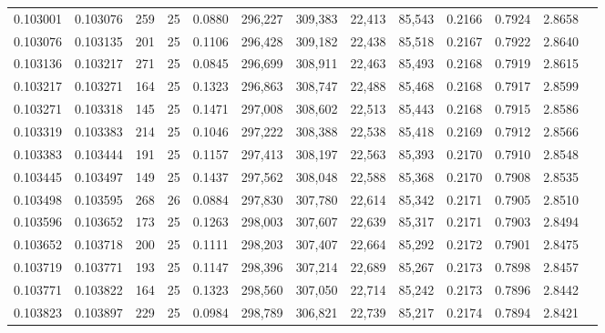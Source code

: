 \begin{tabular}{rrrrrrrrrrrrr}
0.103001 & 0.103076 &   259 &  25 &                                     0.0880 & 296,227 & 309,383 &  22,413 &  85,543 & 0.2166 & 0.7924 & 2.8658 \\
0.103076 & 0.103135 &   201 &  25 &                                     0.1106 & 296,428 & 309,182 &  22,438 &  85,518 & 0.2167 & 0.7922 & 2.8640 \\
0.103136 & 0.103217 &   271 &  25 &                                     0.0845 & 296,699 & 308,911 &  22,463 &  85,493 & 0.2168 & 0.7919 & 2.8615 \\
0.103217 & 0.103271 &   164 &  25 &                                     0.1323 & 296,863 & 308,747 &  22,488 &  85,468 & 0.2168 & 0.7917 & 2.8599 \\
0.103271 & 0.103318 &   145 &  25 &                                     0.1471 & 297,008 & 308,602 &  22,513 &  85,443 & 0.2168 & 0.7915 & 2.8586 \\
0.103319 & 0.103383 &   214 &  25 &                                     0.1046 & 297,222 & 308,388 &  22,538 &  85,418 & 0.2169 & 0.7912 & 2.8566 \\
0.103383 & 0.103444 &   191 &  25 &                                     0.1157 & 297,413 & 308,197 &  22,563 &  85,393 & 0.2170 & 0.7910 & 2.8548 \\
0.103445 & 0.103497 &   149 &  25 &                                     0.1437 & 297,562 & 308,048 &  22,588 &  85,368 & 0.2170 & 0.7908 & 2.8535 \\
0.103498 & 0.103595 &   268 &  26 &                                     0.0884 & 297,830 & 307,780 &  22,614 &  85,342 & 0.2171 & 0.7905 & 2.8510 \\
0.103596 & 0.103652 &   173 &  25 &                                     0.1263 & 298,003 & 307,607 &  22,639 &  85,317 & 0.2171 & 0.7903 & 2.8494 \\
0.103652 & 0.103718 &   200 &  25 &                                     0.1111 & 298,203 & 307,407 &  22,664 &  85,292 & 0.2172 & 0.7901 & 2.8475 \\
0.103719 & 0.103771 &   193 &  25 &                                     0.1147 & 298,396 & 307,214 &  22,689 &  85,267 & 0.2173 & 0.7898 & 2.8457 \\
0.103771 & 0.103822 &   164 &  25 &                                     0.1323 & 298,560 & 307,050 &  22,714 &  85,242 & 0.2173 & 0.7896 & 2.8442 \\
0.103823 & 0.103897 &   229 &  25 &                                     0.0984 & 298,789 & 306,821 &  22,739 &  85,217 & 0.2174 & 0.7894 & 2.8421 \\

\end{tabular}
